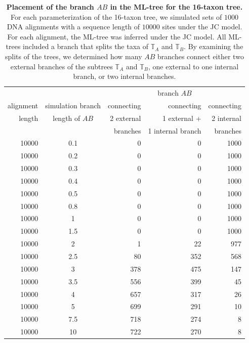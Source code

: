 \begin{appendices}
\begin{table}[hb]
    \centering
    \begin{tabular}{|r|c|r|r|r|}
\hline
      &  &\multicolumn{3}{c|}{branch $AB$}\\
alignment &simulation branch&   connecting  & connecting &  connecting\\
length &length of $AB$ &     2 external & 1 external +  & 2 internal \\
&&     branches & 1 internal branch & branches\\
\hline
10000 &0.1	&  0	& 0  & 1000 \\
10000 &0.2	&  0	& 0  & 1000 \\
10000 &0.3	&  0	& 0  & 1000 \\
10000 &0.4	&  0	& 0  & 1000 \\
10000 &0.5	&  0	& 0  & 1000 \\
10000 &0.8	&  0   	& 0  & 1000 \\
10000 &1   	&  0   	& 0  & 1000 \\
10000 &1.5	& 0   	& 0  & 1000 \\
10000 &2  	& 1	    &22  &977 \\
10000 &2.5	&80	    &352 &568 \\
10000 &3  	&378	&475  &147 \\
10000 &3.5	&556	&399  &45 \\
10000 &4    &657	&317  &26\\
10000 &5  	&699	&291  &10 \\
10000 &7.5	&718	&274  & 8 \\
10000 &10 	&722	&270  & 8\\
\hline
    \end{tabular}
    \vspace{0.25cm}
    \caption{
        \textbf{Placement of the  branch $AB$ in the ML-tree for the 16-taxon tree.}
        For each parameterization of the 16-taxon tree, we simulated sets of $1000$ DNA alignments with a sequence length of $10000$ sites under the JC model. For each alignment, the ML-tree was inferred under the JC model. All ML-trees included a branch that splits the taxa of $\mathbb{T}_A$ and $\mathbb{T}_B$. By examining the splits of the trees, we determined how many $AB$ branches connect either two external branches of the subtrees $\mathbb{T}_A$ and $\mathbb{T}_B$, one external to one internal branch, or two internal branches.
   }
    \label{supptab:bonferroni_correction_10000}
    \end{table}\hfill\\
   

\end{appendices}
